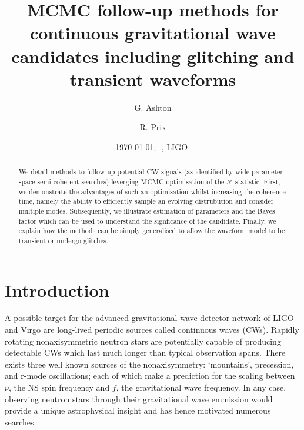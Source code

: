\documentclass[aps, prd, twocolumn, superscriptaddress, floatfix, showpacs, nofootinbib, longbibliography]{revtex4-1}
\newcommand{\dcc}{LIGO-{\color{red}}}
\begin{document}
\title{MCMC follow-up methods for continuous gravitational wave candidates including
glitching and transient waveforms}

    \author{G. Ashton}
    \author{R. Prix}

\date{\today}

\begin{abstract}
We detail methods to follow-up potential CW signals (as identified by
wide-parameter space semi-coherent searches) leverging MCMC optimisation of the
$\mathcal{F}$-statistic. First, we demonstrate the advantages of such an
optimisation whilst increasing the coherence time, namely the ability to
efficiently sample an evolving distrubution and consider multiple modes.
Subsequently, we illustrate estimation of parameters and the Bayes factor which
can be used to understand the signficance of the candidate. Finally, we explain
how the methods can be simply generalised to allow the waveform model to be
transient or undergo glitches.

\end{abstract}


\date{\commitDATE; \commitIDshort-\commitSTATUS, \dcc}

\maketitle


\section{Introduction}

A possible target for the advanced gravitational wave detector network of LIGO
and Virgo are long-lived periodic sources called continuous waves (CWs).
Rapidly rotating nonaxisymmetric neutron stars are potentially capable of
producing detectable CWs which last much longer than typical observation spans.
There exists three well known sources of the nonaxisymmetry: `mountains',
precession, and r-mode oscillations; each of which make a prediction for the
scaling between $\nu$, the NS spin frequency and $f$, the gravitational wave
frequency. In any case, observing neutron stars through their gravitational
wave emmission would provide a unique astrophysical insight and has hence
motivated numerous searches.
\end{document}
